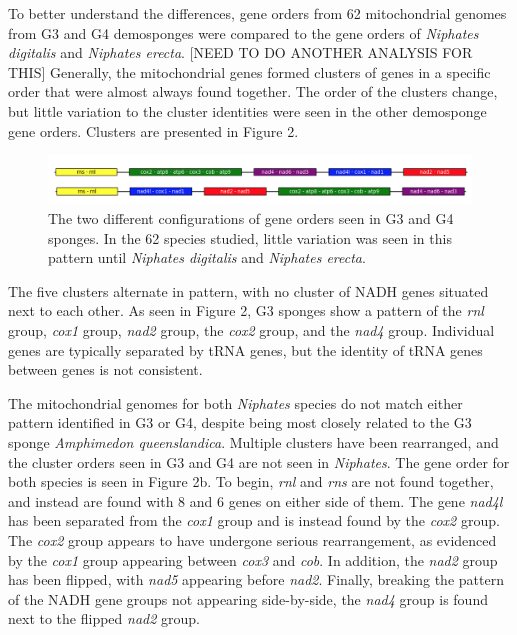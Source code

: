 \documentclass[../main.tex]{subfiles}
\begin{document}
To better understand the differences, gene orders from 62 mitochondrial genomes from G3 and G4 demosponges were compared to the gene orders of \emph{Niphates digitalis} and \emph{Niphates erecta}. [NEED TO DO ANOTHER ANALYSIS FOR THIS] Generally, the mitochondrial genes formed clusters of genes in a specific order that were almost always found together. The order of the clusters change, but little variation to the cluster identities were seen in the other demosponge gene orders. Clusters are presented in Figure 2.

\begin{figure}[htp]
    \centering
    \includegraphics[width=1.0\textwidth]{Figures/figure 2.png}
    \caption{The two different configurations of gene orders seen in G3 and G4 sponges. In the 62 species studied, little variation was seen in this pattern until \emph{Niphates digitalis} and \emph{Niphates erecta}.}
\end{figure}

The five clusters alternate in pattern, with no cluster of NADH genes situated next to each other. As seen in Figure 2, G3 sponges show a pattern of the \emph{rnl} group, \emph{cox1} group, \emph{nad2} group, the \emph{cox2} group, and the \emph{nad4} group. Individual genes are typically separated by tRNA genes, but the identity of tRNA genes between genes is not consistent. 

The mitochondrial genomes for both \emph{Niphates} species do not match either pattern identified in G3 or G4, despite being most closely related to the G3 sponge \emph{Amphimedon queenslandica}. Multiple clusters have been rearranged, and the cluster orders seen in G3 and G4 are not seen in \emph{Niphates}. The gene order for both species is seen in Figure 2b. To begin, \emph{rnl} and \emph {rns} are not found together, and instead are found with 8 and 6 genes on either side of them. The gene \emph{nad4l} has been separated from the \emph{cox1} group and is instead found by the \emph{cox2} group. The \emph{cox2} group appears to have undergone serious rearrangement, as evidenced by the \emph{cox1} group appearing between \emph{cox3} and \emph{cob}. In addition, the \emph{nad2} group has been flipped, with \emph{nad5} appearing before \emph{nad2}. Finally, breaking the pattern of the NADH gene groups not appearing side-by-side, the \emph{nad4} group is found next to the flipped \emph{nad2} group. 
\end{document}
